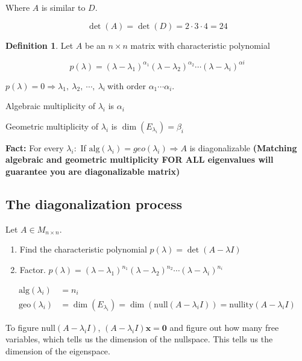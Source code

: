 \documentclass[12pt]{article}
\theoremstyle{plain}
\theoremstyle{remark}
\theoremstyle{definition}
\newtheorem{definition}{Definition}[section]
\begin{document}
Where \(A\) is similar to \(D\).

\[\det(A) = \det(D) = 2 \cdot 3 \cdot 4 = 24\]

\begin{definition}
Let \(A\) be an \(n \times n\) matrix with
characteristic polynomial

\[p(\lambda) = \left( \lambda - \lambda_{1} \right)^{\alpha_{1}}\left( \lambda - \lambda_{2} \right)^{\alpha_{2}}\cdots\left( \lambda - \lambda_{i} \right)^{\alpha i}\]
\end{definition}

\(p(\lambda) = 0 \Rightarrow \lambda_{1},\ \lambda_{2},\ \cdots,\ \lambda_{i}\ \)with
order \(\alpha_{1}\cdots\alpha_{i}\).

Algebraic multiplicity of \(\lambda_{i}\) is \(\alpha_{i}\)

Geometric multiplicity of \(\lambda_{i}\) is
\(\dim\left( E_{\lambda_{i}} \right) = \beta_{i}\)

\textbf{Fact:} For every \(\lambda_{i}:\) If
\(\text{alg}\left( \lambda_{i} \right) = geo\left( \lambda_{i} \right) \Rightarrow A\)
is diagonalizable \textbf{(Matching algebraic and geometric multiplicity
FOR ALL eigenvalues will guarantee you are diagonalizable matrix)}


\subsection{The diagonalization
process}

Let \(A \in M_{n \times n}\).

\begin{enumerate}
\def\labelenumi{\arabic{enumi}.}
\item
  Find the characteristic polynomial
  \(p(\lambda) = \det(A - \lambda I)\)
\item
  Factor.
  \(p(\lambda) = \left( \lambda - \lambda_{1} \right)^{n_{1}}\left( \lambda - \lambda_{2} \right)^{n_{2}}\cdots\left( \lambda - \lambda_{i} \right)^{n_{i}}\)
\end{enumerate}

\begin{align*}
\text{alg}\left( \lambda_{i} \right) &= n_{i} \\
\text{geo}\left( \lambda_{i} \right) &= \dim\left( E_{\lambda_{i}} \right) = \dim\left( \text{null}\left( A - \lambda_{i}I \right) \right) = \text{nullity}\left( A - \lambda_{i}I \right)
\end{align*}


To figure \(\text{null}\left( A - \lambda_{i}I \right)\),
\(\left( A - \lambda_{i}I \right)\mathbf{x} = \mathbf{0}\) and
figure out how many free variables, which tells us the dimension of the
nullspace. This tells us the dimension of the eigenspace.
\end{document}
